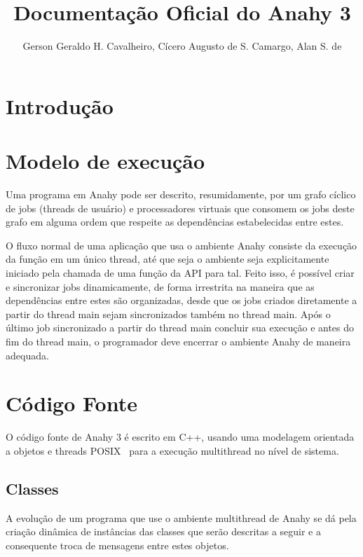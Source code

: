 \documentclass[12pt]{article} usepackage{sbc-template} usepackage{graphicx,url}
\title{Documentação Oficial do Anahy 3}
\author{Gerson Geraldo H. Cavalheiro, Cícero Augusto de S. Camargo, Alan S. de
\Araújo}
\begin{document}
\maketitle

\section{Introdução} %


\section{Modelo de execução} %

Uma programa em Anahy pode ser descrito, resumidamente, por um grafo cíclico de
jobs (threads de usuário) e processadores virtuais que consomem os jobs deste
grafo em alguma ordem que respeite as dependências estabelecidas entre estes.

O fluxo normal de uma aplicação que usa o ambiente Anahy consiste da execução
da função  em um único thread, até que seja o ambiente seja
explicitamente iniciado pela chamada de uma função da API para tal. Feito
isso, é possível criar e sincronizar jobs dinamicamente, de forma irrestrita
na maneira que as dependências entre estes são organizadas, desde que os jobs
criados diretamente a partir do thread main sejam sincronizados também no
thread main. Após o último job sincronizado a partir do thread main concluir
sua execução e antes do fim do thread main, o programador deve encerrar o
ambiente Anahy de maneira adequada.


\section{Código Fonte} %

O código fonte de Anahy 3 é escrito em C++, usando uma modelagem orientada a
objetos e threads POSIX~\cite{NicholsPthreads} para a execução multithread no
nível de sistema.

\subsection{Classes} %

A evolução de um programa que use o ambiente multithread de Anahy se dá pela
criação dinâmica de instâncias das classes que serão descritas a seguir e a consequente troca de
mensagens entre estes objetos.
\end{document}
